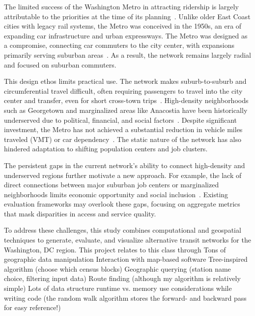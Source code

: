 \documentclass[manuscript,nonacm]{acmart}
\begin{document}
The limited success of the Washington Metro in attracting ridership is largely attributable to the priorities at the time of its planning~\cite{lit:wmata_history}. Unlike older East Coast cities with legacy rail systems, the Metro was conceived in the 1950s, an era of expanding car infrastructure and urban expressways. The Metro was designed as a compromise, connecting car commuters to the city center, with expansions primarily serving suburban areas~\cite{lit:wmata_history}. As a result, the network remains largely radial and focused on suburban commuters.

This design ethos limits practical use. The network makes suburb-to-suburb and circumferential travel difficult, often requiring passengers to travel into the city center and transfer, even for short cross-town trips~\cite{lit:wmata_stats}. High-density neighborhoods such as Georgetown and marginalized areas like Anacostia have been historically underserved due to political, financial, and social factors~\cite{lit:equity}. Despite significant investment, the Metro has not achieved a substantial reduction in vehicle miles traveled (VMT) or car dependency~\cite{lit:env}. The static nature of the network has also hindered adaptation to shifting population centers and job clusters.

The persistent gaps in the current network's ability to connect high-density and underserved regions further motivate a new approach. For example, the lack of direct connections between major suburban job centers or marginalized neighborhoods limits economic opportunity and social inclusion~\cite{lit:equity}. Existing evaluation frameworks may overlook these gaps, focusing on aggregate metrics that mask disparities in access and service quality. 

To address these challenges, this study combines computational and geospatial techniques to generate, evaluate, and visualize alternative transit networks for the Washington, DC region. This project relates to this class through Tons of geographic data manipulation
Interaction with map-based software
Tree-inspired algorithm (choose which census blocks)
Geographic querying (station name choice, filtering input data)
Route finding (although my algorithm is relatively simple)
Lots of data structure runtime vs. memory use considerations while writing code (the random walk algorithm stores the forward- and backward pass for easy reference!)



\end{document}
